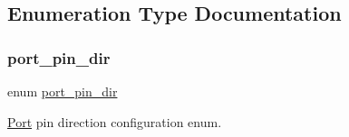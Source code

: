 \subsection{Enumeration Type Documentation}
\mbox{\label{group__asfdoc__sam0__port__group_gabe12893c067f9b011ece79c1bf1b128a}} 
\subsubsection{\texorpdfstring{port\_pin\_dir}{port\_pin\_dir}}
{\footnotesize\ttfamily enum \mbox{\hyperlink{group__asfdoc__sam0__port__group_gabe12893c067f9b011ece79c1bf1b128a}{port\+\_\+pin\+\_\+dir}}}



\mbox{\hyperlink{struct_port}{Port}} pin direction configuration enum. 

